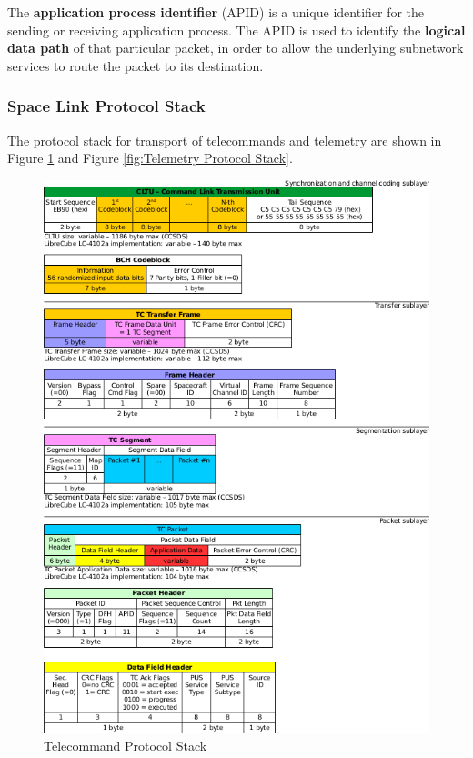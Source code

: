 The \textbf{application process identifier} (APID) is a unique identifier for the sending or receiving application process. The APID is used to identify the \textbf{logical data path} of that particular packet, in order to allow the underlying subnetwork services to route the packet to its destination. 

\subsubsection{Space Link Protocol Stack}

The protocol stack for transport of telecommands and telemetry are shown in Figure \ref{fig:Telecommand Protocol Stack} and Figure \ref{fig:Telemetry Protocol Stack}.

\begin{figure}[h]
\centering\includegraphics[scale=0.7]{fig/telecommand_protocol_stack}
\caption{Telecommand Protocol Stack}
\label{fig:Telecommand Protocol Stack}
\end{figure}

